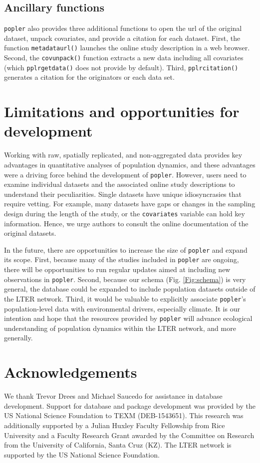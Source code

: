 \documentclass{article}\usepackage[]{graphicx}\usepackage[]{color}
\begin{document}
\subsection*{Ancillary functions}
\texttt{popler} also provides three additional functions to open the url of the original dataset, unpack covariates, and provide a citation for each dataset. First, the function \texttt{metadata\textunderscore url()} launches the online study description in a web browser. Second, the \texttt{cov\textunderscore unpack()} function extracts a new data including all covariates (which \texttt{pplr\textunderscore get\textunderscore data()} does not provide by default). Third, \texttt{pplr\textunderscore citation()} generates a citation for the originators or each data set.  
\section*{Limitations and opportunities for development}
Working with raw, spatially replicated, and non-aggregated data provides key advantages in quantitative analyses of population dynamics, and these advantages were a driving force behind the development of \texttt{popler}. However, users need to examine individual datasets and the associated online study descriptions to understand their peculiarities. Single datasets have unique idiosyncrasies that require vetting. For example, many datasets have gaps or changes in the sampling design during the length of the study, or the  \texttt{covariates} variable can hold key information. Hence, we urge authors to consult the online documentation of the original datasets.

In the future, there are opportunities to increase the size of \texttt{popler} and expand its scope. First, because many of the studies included in \texttt{popler} are ongoing, there will be opportunities to run regular updates aimed at including new observations in \texttt{popler}.  Second, because our schema (Fig. \ref{Fig:schema}) is very general, the database could be expanded to include population datasets outside of the LTER network. Third, it would be valuable to explicitly associate \texttt{popler}'s population-level data with environmental drivers, especially climate. It is our intention and hope that the resources provided by \texttt{popler} will advance ecological understanding of population dynamics within the LTER network, and more generally.

\section*{Acknowledgements}
We thank Trevor Drees and Michael Saucedo for assistance in database development. Support for database and package development was provided by the US National Science Foundation to TEXM (DEB-1543651). This research was additionally supported by a Julian Huxley Faculty Fellowship from Rice University and a Faculty Research Grant awarded by the Committee on Research from the University of California, Santa Cruz (KZ). The LTER network is supported by the US National Science Foundation.
\end{document}
